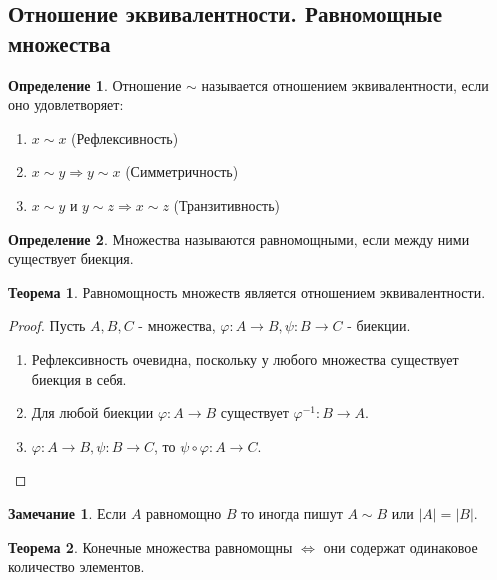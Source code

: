 \documentclass[a4paper, 12pt]{article}
\renewcommand{\phi}{\varphi}
\theoremstyle{definition}
\newtheorem*{definition}{Определение}
\newtheorem*{theorem}{Теорема}
\newtheorem*{comm}{Замечание}
\begin{document}
        \subsection{Отношение эквивалентности. Равномощные множества}
        \begin{definition}
            Отношение $\sim$ называется отношением эквивалентности, если оно удовлетворяет:
            \begin{enumerate}
                \item $x\sim x$ (Рефлексивность)
                \item $x\sim y \Rightarrow y\sim x$ (Симметричность)
                \item $x\sim y$ и $y\sim z\Rightarrow x\sim z$ (Транзитивность)
            \end{enumerate}
        \end{definition} 
        \begin{definition}
            Множества называются равномощными, если между ними существует биекция.
        \end{definition}
        \begin{theorem}
            Равномощность множеств является отношением эквивалентности.
        \end{theorem}
        \begin{proof} Пусть $A,B,C$ - множества, $\phi:A\to B, \psi:B\to C$ - биекции.
            \begin{enumerate}
                \item Рефлексивность очевидна, поскольку у любого множества существует биекция в себя.
                \item Для любой биекции $\phi:A\to B$ существует $\phi^{-1}:B\to A$.
                \item $\phi:A\to B, \psi:B\to C$, то $\psi \circ \phi: A\to C$.
            \end{enumerate}
        \end{proof} 
        \begin{comm}
            Если $A$ равномощно $B$ то иногда пишут $A\sim B$ или $|A|=|B|$.
        \end{comm} 
        \begin{theorem}
            Конечные множества равномощны $\Leftrightarrow$ они содержат одинаковое количество элементов.
        \end{theorem}
\end{document}
